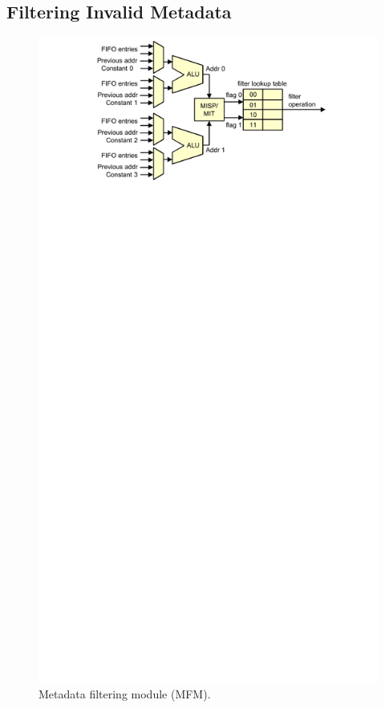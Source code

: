 \subsection{Filtering Invalid Metadata}
\label{sec:monitoring_hard_drop.hwdrop.filter}

\begin{figure}
  \begin{center}
    \includegraphics{monitoring_hard_drop/figs/mfm.pdf}
    \caption{Metadata filtering module (MFM).}
    \label{fig:monitoring_hard_drop.hwdrop.mfm}
  \end{center}
\end{figure}

